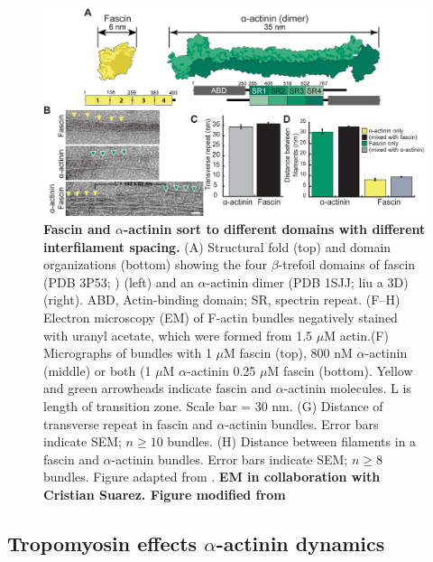 \begin{figure}
\centering
\includegraphics[width=14cm]{img/ch03/Thesis_EM_fig.png}
\caption[Fascin and \texorpdfstring{$\alpha$}{alpha}-actinin sort to different domains with different interfilament spacing.]{\textbf{Fascin and $\alpha$-actinin sort to different domains with different interfilament spacing.} (A) Structural fold (top) and domain organizations (bottom) showing the four $\beta$-trefoil domains of fascin (PDB 3P53; \citep{jansen_mechanism_2011}) (left) and an $\alpha$-actinin dimer (PDB 1SJJ; {liu a 3D}) (right). ABD, Actin-binding domain; SR, spectrin repeat. (F–H) Electron microscopy (EM) of F-actin bundles negatively stained with uranyl acetate, which were formed from 1.5 $\mu$M actin.(F) Micrographs of bundles with 1 $\mu$M fascin (top), 800 nM $\alpha$-actinin (middle) or both (1 $\mu$M $\alpha$-actinin 0.25 $\mu$M fascin (bottom). Yellow and green arrowheads indicate fascin and $\alpha$-actinin molecules. L is length of transition zone. Scale bar = 30 nm. (G) Distance of transverse repeat in fascin and $\alpha$-actinin bundles. Error bars indicate SEM; $n\geq10$ bundles. (H) Distance between filaments in a fascin and $\alpha$-actinin bundles. Error bars indicate SEM; $n\geq8$ bundles. Figure adapted from \citep{winkelman_fascin-_2016}. \textbf{EM in collaboration with Cristian Suarez. Figure modified from \citep{winkelman_fascin-_2016}}}
\label{fig:em_fascin_aact}
\end{figure}

\subsection{Tropomyosin effects \texorpdfstring{$\alpha$}{a}-actinin dynamics}


